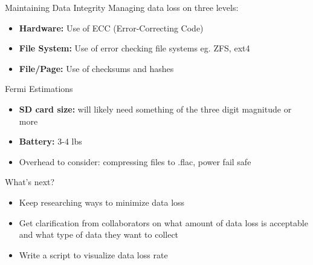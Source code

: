\begin{frame}{Maintaining Data Integrity}
    Managing data loss on three levels:
    \begin{itemize}
        \item \textbf{Hardware:} Use of ECC (Error-Correcting Code)
        \item \textbf{File System:} Use of error checking file systems eg. ZFS, ext4
        \item \textbf{File/Page:} Use of checksums and hashes
    \end{itemize}
\end{frame}

\begin{frame}{Fermi Estimations}
    \begin{itemize}
        \item \textbf{SD card size:} will likely need something of the three digit magnitude or more
        \item \textbf{Battery:} 3-4 lbs
        \item Overhead to consider: compressing files to .flac, power fail safe
    \end{itemize}
\end{frame}

\begin{frame}{What's next?}
    \begin{itemize}
        \item Keep researching ways to minimize data loss
        \item Get clarification from collaborators on what amount of data loss is acceptable and what type of data they want to collect
        \item Write a script to visualize data loss rate
    \end{itemize}
\end{frame}
